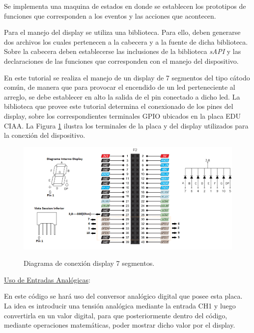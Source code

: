 \documentclass[12pt,letterpaper]{article}
\begin{document}
Se implementa una maquina de estados en donde se establecen los prototipos de funciones que corresponden a los eventos y las acciones que acontecen. 

Para el manejo del display se utiliza una biblioteca. Para ello, deben generarse dos archivos los cuales pertenecen a la cabecera y a la fuente de dicha biblioteca. Sobre la cabecera deben establecerse las inclusiones de la biblioteca \textit{sAPI} y las declaraciones de las funciones que corresponden con el manejo del dispositivo.

En este tutorial se realiza el manejo de un display de 7 segmentos del tipo cátodo común, de manera que para provocar el encendido de un led perteneciente al arreglo, se debe establecer en alto la salida de el pin conectado a dicho led. La biblioteca que provee este tutorial determina el conexionado de los pines del display, sobre los correspondientes terminales GPIO ubicados en la placa EDU CIAA. La Figura \ref{Fig23} ilustra los terminales de la placa y del display utilizados para la conexión del dispositivo.

\begin{center}
\begin{figure}[!h]
\centering
\includegraphics[width=10 cm]{figuras/f5.png}\\
\caption{Diagrama de conexión display 7 segmentos.}
\label{Fig23}
\end{figure}
\end{center}
\underline{Uso de Entradas Analógicas}:

En este código se hará uso del conversor analógico digital que posee esta placa. La idea es introducir una tensión analógica mediante la entrada CH1 y luego convertirla en un valor digital, para que posteriormente dentro del código, mediante operaciones matemáticas, poder mostrar dicho valor por el display.
\end{document}
